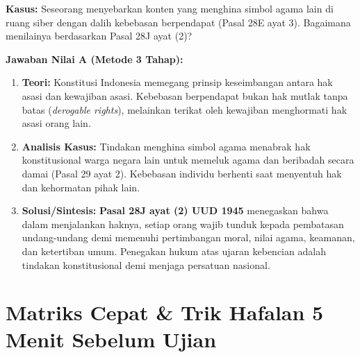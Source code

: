 \documentclass[10pt,a4paper]{article}
\begin{document}
\begin{soalbox}
\textbf{Kasus:} Seseorang menyebarkan konten yang menghina simbol agama lain di ruang siber dengan dalih kebebasan berpendapat (Pasal 28E ayat 3). Bagaimana menilainya berdasarkan Pasal 28J ayat (2)?

\tcblower
\textbf{Jawaban Nilai A (Metode 3 Tahap):}
\begin{enumerate}
  \item \textbf{Teori:} Konstitusi Indonesia memegang prinsip keseimbangan antara hak asasi dan kewajiban asasi. Kebebasan berpendapat bukan hak mutlak tanpa batas (\textit{derogable rights}), melainkan terikat oleh kewajiban menghormati hak asasi orang lain.
  \item \textbf{Analisis Kasus:} Tindakan menghina simbol agama menabrak hak konstitusional warga negara lain untuk memeluk agama dan beribadah secara damai (Pasal 29 ayat 2). Kebebasan individu berhenti saat menyentuh hak dan kehormatan pihak lain.
  \item \textbf{Solusi/Sintesis:} \textbf{Pasal 28J ayat (2) UUD 1945} menegaskan bahwa dalam menjalankan haknya, setiap orang wajib tunduk kepada pembatasan undang-undang demi memenuhi pertimbangan moral, nilai agama, keamanan, dan ketertiban umum. Penegakan hukum atas ujaran kebencian adalah tindakan konstitusional demi menjaga persatuan nasional.
\end{enumerate}
\end{soalbox}

\section*{Matriks Cepat \& Trik Hafalan 5 Menit Sebelum Ujian}
\end{document}
